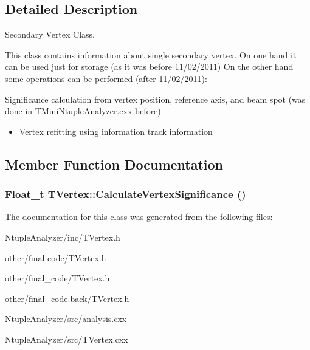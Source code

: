 \subsection{Detailed Description}
Secondary Vertex Class. 

This class contains information about single secondary vertex. On one hand it can be used just for storage (as it was before 11/02/2011) On the other hand some operations can be performed (after 11/02/2011): \begin{itemize}
\end{itemize}
Significance calculation from vertex position, reference axis, and beam spot (was done in TMini\-Ntuple\-Analyzer.cxx before) \begin{itemize}
\item Vertex refitting using information track information  \end{itemize}




\subsection{Member Function Documentation}
\subsubsection{\setlength{\rightskip}{0pt plus 5cm}Float\_\-t TVertex::Calculate\-Vertex\-Significance ()}\label{classTVertex_828ec2bd461c898cf280a2a269a8c8ef}




The documentation for this class was generated from the following files:\begin{CompactItemize}
\item 
Ntuple\-Analyzer/inc/TVertex.h\item 
other/final code/TVertex.h\item 
other/final\_\-code/TVertex.h\item 
other/final\_\-code.back/TVertex.h\item 
Ntuple\-Analyzer/src/analysis.cxx\item 
Ntuple\-Analyzer/src/TVertex.cxx\end{CompactItemize}
